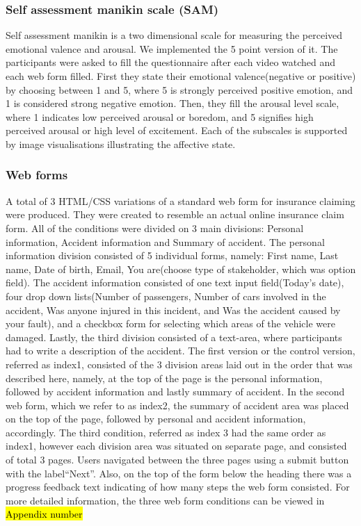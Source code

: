 \documentclass[a4paper]{report}
\begin{document}
			\subsubsection{Self assessment manikin scale (SAM)}
			Self assessment manikin\cite{bradley1994measuring} is a two dimensional scale for measuring the perceived emotional valence and arousal. We implemented the 5 point version of it. The participants were asked to fill the questionnaire after each video watched and each web form filled. First they state their emotional valence(negative or positive) by choosing between 1 and 5, where 5 is strongly perceived positive emotion, and 1 is considered strong negative emotion. Then, they fill the arousal level scale, where 1 indicates low perceived arousal or boredom, and 5 signifies high perceived arousal or high level of excitement. Each of the subscales is supported by image visualisations illustrating the affective state.
			\subsubsection{Web forms}
			A total of 3 HTML/CSS variations of a standard web form for insurance claiming were produced. They were created to resemble an actual online insurance claim form. All of the conditions were divided on 3 main divisions: Personal information, Accident information and Summary of accident. The personal information division consisted of 5 individual forms, namely: First name, Last name, Date of birth, Email, You are(choose type of stakeholder, which was option field). The accident information consisted of one text input field(Today's date), four drop down lists(Number of passengers, Number of cars involved in the accident, Was anyone injured in this incident, and Was the accident caused by your fault), and a checkbox form for selecting which areas of the vehicle were damaged. Lastly, the third division consisted of a text-area, where participants had to write a description of the accident. The first version or the control version, referred as index1, consisted of the 3 division areas laid out in the order that was described here, namely, at the top of the page is the personal information, followed by accident information and lastly summary of accident. In the second web form, which we refer to as index2, the summary of accident area was placed on the top of the page, followed by personal and accident information, accordingly. The third condition, referred as index 3 had the same order as index1, however each division area was situated on separate page, and consisted of total 3 pages. Users navigated between the three pages using a submit button with the label``Next''. Also, on the top of the form below the heading there was a progress feedback text indicating of how many steps the web form consisted. For more detailed information, the three web form conditions can be viewed in \hl{Appendix number}
\end{document}
